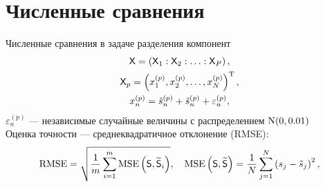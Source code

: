 \documentclass[pdf, unicode, 9pt, notheorems, handout]{beamer}
\begin{document}
    
    \section{Численные сравнения}\label{sec:numerical-comparison}
    \begin{frame}{Численные сравнения в задаче разделения компонент}
        \begin{gather*}
            \mathsf{X} = \left(\mathsf{X}_1: \mathsf{X}_2: \ldots: \mathsf{X}_P\right),\\
            \mathsf{X}_p = \left(x_1^{(p)}, x_2^{(p)}, \ldots, x_N^{(p)}\right)^{\mathrm{T}},\\
            x_n^{(p)} = \hat{s}_n^{(p)} + \tilde{s}_n^{(p)} + \varepsilon_n^{(p)},
        \end{gather*}
        $\varepsilon_n^{(p)}$ --- независимые случайные величины с распределением $\mathrm{N}(0, 0.01)$\\ \vspace{0.2cm}
        Оценка точности --- среднеквадратичное отклонение (RMSE):
        \[
             \text{RMSE} = \sqrt{\frac{1}{m} \sum_{i=1}^{m} \text{MSE}\left(\mathsf{S}, \widetilde{\mathsf{S}}_i\right)},
             \quad \text{MSE}\left(\mathsf{S}, \widetilde{\mathsf{S}} \right) = \frac{1}{N} \sum_{j=1}^{N}
             \left(s_j - \tilde{s}_j\right)^2,
        \]
    \end{frame}
    
\end{document}
